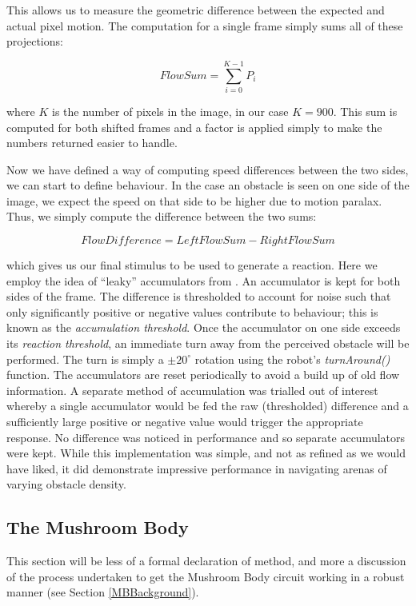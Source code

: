 \documentclass[a4paper,12pt,twoside,openright]{article}
\begin{document}
This allows us to measure the geometric difference between the expected and actual pixel motion. The computation
for a single frame simply sums all of these projections:

\begin{equation}
  FlowSum = \sum_{i = 0}^{K - 1} P_i
\end{equation}

where $K$ is the number of pixels in the image, in our case $K = 900$. This sum is computed for both shifted frames
and a factor is applied simply to make the numbers returned easier to handle.
\newline

Now we have defined a way of computing speed differences between the two sides, we
can start to define behaviour. In the case an obstacle is seen on one side of the image, we expect the speed
on that side to be higher due to motion paralax. Thus, we simply compute the difference between the
two sums:

\begin{equation}
FlowDifference = LeftFlowSum - RightFlowSum
\end{equation}

which gives us our final stimulus to be used to generate a reaction. Here we employ the idea of ``leaky'' accumulators
from \cite{Stewart2010}. An accumulator is kept for both sides of the frame. The difference is thresholded to account
for noise such that only significantly positive or negative values contribute to behaviour; this is known as the
\textit{accumulation threshold}. Once the accumulator on one side exceeds its \textit{reaction threshold}, an immediate
turn away from the perceived obstacle will be performed. The turn is simply a $\pm 20^{\circ}$ rotation using the robot's
\textit{turnAround()} function. The accumulators are reset periodically to avoid a build up of old flow information.
A separate method of accumulation was trialled out of interest whereby a single accumulator would be fed the raw (thresholded) difference
and a sufficiently large positive or negative value would trigger the appropriate response. No difference was noticed in
performance and so separate accumulators were kept. While this implementation was simple, and not as refined
as we would have liked, it did demonstrate impressive performance in navigating arenas of varying obstacle density.

\subsection{The Mushroom Body}
This section will be less of a formal declaration of method, and more a discussion of the process undertaken to get
the Mushroom Body circuit working in a robust manner (see Section \ref{MBBackground}).
\end{document}
